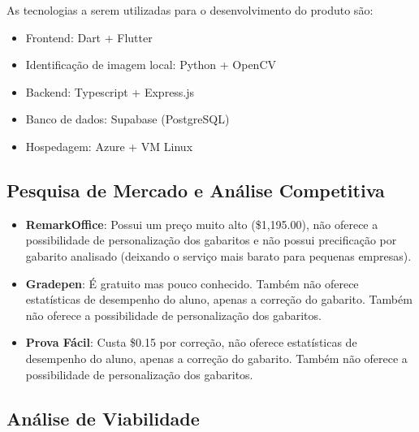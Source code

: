 \documentclass[12pt]{article}
\begin{document}
As tecnologias a serem utilizadas para o desenvolvimento do produto são:

\begin{itemize}
    \item Frontend: Dart + Flutter
    \item Identificação de imagem local: Python + OpenCV
    \item Backend: Typescript + Express.js
    \item Banco de dados: Supabase (PostgreSQL)
    \item Hospedagem: Azure + VM Linux
\end{itemize}

\subsection{Pesquisa de Mercado e Análise Competitiva}

\begin{itemize}
    \item \textbf{RemarkOffice}: Possui um preço muito alto (\$1,195.00), não oferece a possibilidade de personalização dos gabaritos e não possui precificação por gabarito analisado (deixando o serviço mais barato para pequenas empresas). 
    \item \textbf{Gradepen}: É gratuito mas pouco conhecido. Também não oferece estatísticas de desempenho do aluno, apenas a correção do gabarito. Também não oferece a possibilidade de personalização dos gabaritos.
    \item \textbf{Prova Fácil}: Custa \$0.15 por correção, não oferece estatísticas de desempenho do aluno, apenas a correção do gabarito. Também não oferece a possibilidade de personalização dos gabaritos.
\end{itemize}



\subsection{Análise de Viabilidade}
\end{document}

